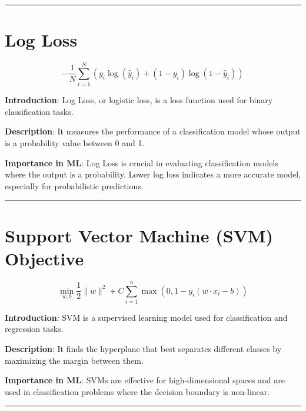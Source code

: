 \documentclass[
  12 pt,
  a4paper,
]{book}
\numberwithin{equation}{section}
\theoremstyle{plain}      %
\theoremstyle{definition} %
\theoremstyle{remark}     %
\theoremstyle{note}         %
\begin{document}
\begin{center}\rule{0.5\linewidth}{0.5pt}\end{center}

\newpage

\hypertarget{log-loss}{%
\chapter{Log Loss}\label{log-loss}}

\[
-\frac{1}{N} \sum_{i=1}^N \left( y_i \log(\hat{y}_i) + (1 - y_i) \log(1 - \hat{y}_i) \right)
\]

\textbf{Introduction}: Log Loss, or logistic loss, is a loss function
used for binary classification tasks.

\textbf{Description}: It measures the performance of a classification
model whose output is a probability value between 0 and 1.

\textbf{Importance in ML}: Log Loss is crucial in evaluating
classification models where the output is a probability. Lower log loss
indicates a more accurate model, especially for probabilistic
predictions.

\begin{center}\rule{0.5\linewidth}{0.5pt}\end{center}

\newpage

\hypertarget{support-vector-machine-svm-objective}{%
\chapter{Support Vector Machine (SVM)
Objective}\label{support-vector-machine-svm-objective}}

\[
\min_{w, b} \frac{1}{2} \|w\|^2 + C \sum_{i=1}^n \max(0, 1 - y_i (w \cdot x_i - b))
\]

\textbf{Introduction}: SVM is a supervised learning model used for
classification and regression tasks.

\textbf{Description}: It finds the hyperplane that best separates
different classes by maximizing the margin between them.

\textbf{Importance in ML}: SVMs are effective for high-dimensional
spaces and are used in classification problems where the decision
boundary is non-linear.

\begin{center}\rule{0.5\linewidth}{0.5pt}\end{center}

\newpage
\end{document}
